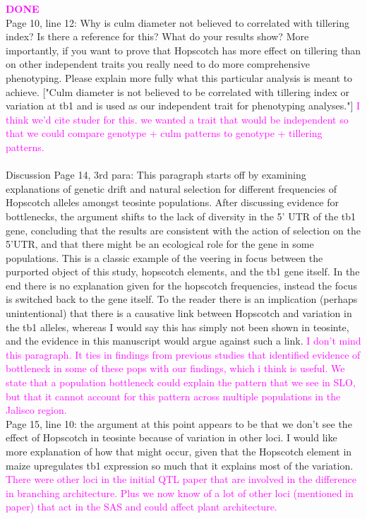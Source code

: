 \documentclass[11pt]{article}
\newcommand{\lev}[1]{\noindent \textcolor{magenta}{{#1}} \\}
\begin{document}
\lev{\bf{DONE}} Page 10, line 12: Why is culm diameter not believed to correlated with tillering index?  Is there a reference for this? What do your results show?  More importantly, if you want to prove that Hopscotch has more effect on tillering than on other independent traits you really need to do more comprehensive phenotyping.  Please explain more fully what this particular analysis is meant to achieve.
["Culm diameter is not believed to be correlated with tillering index or variation at tb1 and is used as our independent trait for phenotyping analyses."]
\lev{I think we'd cite studer for this. we wanted a trait that would be independent so that we could compare genotype + culm patterns to genotype + tillering patterns.}\\
Discussion
Page 14, 3rd para: This paragraph starts off by examining explanations of genetic drift and natural selection for different frequencies of Hopscotch alleles amongst teosinte populations.  After discussing evidence for bottlenecks, the argument shifts to the lack of diversity in the 5' UTR of the tb1 gene, concluding that the results are consistent with the action of selection on the 5'UTR, and that there might be an ecological role for the gene in some populations.  This is a classic example of the veering in focus between the purported object of this study, hopscotch elements, and the tb1 gene itself.  In the end there is no explanation given for the hopscotch frequencies, instead the focus is switched back to the gene itself.  To the reader there is an implication (perhaps unintentional) that there is a causative link between Hopscotch and variation in the tb1 alleles, whereas I would say this has simply not been shown in teosinte, and the evidence in this manuscript would
argue against such a link.
\lev{I don't mind this paragraph. It ties in findings from previous studies that identified evidence of bottleneck in some of these pops with our findings, which i think is useful. We state that a population bottleneck could explain the pattern that we see in SLO, but that it cannot account for this pattern across multiple populations in the Jalisco region.}

Page 15, line 10: the argument at this point appears to be that we don't see the effect of Hopscotch in teosinte because of variation in other loci.  I would like more explanation of how that might occur, given that the Hopscotch element in maize upregulates tb1 expression so much that it explains most of the variation.  
\lev{There were other loci in the initial QTL paper that are involved in the difference in branching architecture. Plus we now know of a lot of other loci (mentioned in paper) that act in the SAS and could affect plant architecture.}
\end{document}
